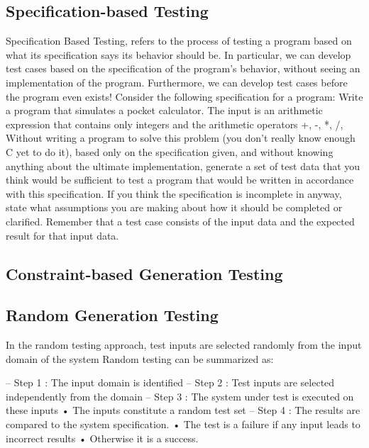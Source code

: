 \documentclass[citeauthoryear]{llncs}
\begin{document}
\subsection{Specification-based Testing}
Specification Based Testing, refers to the process of testing a program based on what its specification says its behavior should be. In particular, we can develop test cases based on the specification of the program's behavior, without seeing an implementation of the program. Furthermore, we can develop test cases before the program even exists!
Consider the following specification for a program:
Write a program that simulates a pocket calculator. The input is an arithmetic expression that contains only integers and the arithmetic operators +, -, *, /, %
Without writing a program to solve this problem (you don't really know enough C yet to do it), based only on the specification given, and without knowing anything about the ultimate implementation, generate a set of test data that you think would be sufficient to test a program that would be written in accordance with this specification. If you think the specification is incomplete in anyway, state what assumptions you are making about how it should be completed or clarified.
Remember that a test case consists of the input data and the expected result for that input data.


\subsection{Constraint-based Generation Testing}

\subsection{Random Generation Testing}
In the random testing approach, test inputs are selected randomly from the input domain of the system
Random testing can be summarized as:

– Step 1 : The input domain is identified
– Step 2 : Test inputs are selected independently from the domain
– Step 3 : The system under test is executed on these inputs
• The inputs constitute a random test set
– Step 4 : The results are compared to the system specification.
• The test is a failure if any input leads to incorrect results
• Otherwise it is a success.
\end{document}
